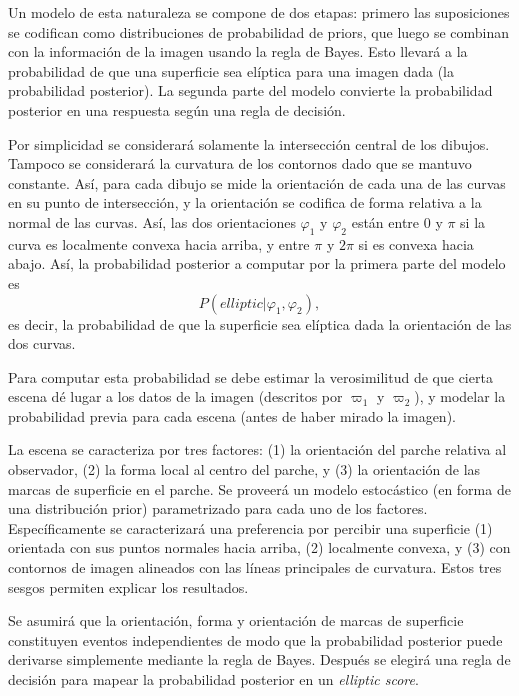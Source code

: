 \documentclass[a4paper,12pt]{article}
\begin{document}
Un modelo de esta naturaleza se compone de dos etapas: primero las suposiciones se codifican como distribuciones de probabilidad de priors, que luego se combinan con la información de la imagen usando la regla de Bayes. Esto llevará a la probabilidad de que una superficie sea elíptica para una imagen dada (la probabilidad posterior). La segunda parte del modelo convierte la probabilidad posterior en una respuesta según una regla de decisión.

Por simplicidad se considerará solamente la intersección central de los dibujos. Tampoco se considerará la curvatura de los contornos dado que se mantuvo constante. Así, para cada dibujo se mide la orientación de cada una de las curvas en su punto de intersección, y la orientación se codifica de forma relativa a la normal de las curvas. Así, las dos orientaciones $\varphi_{1}$ y $\varphi_{2}$ están entre 0 y $\pi$ si la curva es localmente convexa hacia arriba, y entre $\pi$ y $2\pi$ si es convexa hacia abajo. Así, la probabilidad posterior a computar por la primera parte del modelo es 
\begin{equation}
	P(elliptic | \varphi_{1}, \varphi_{2}),
\end{equation}
es decir, la probabilidad de que la superficie sea elíptica dada la orientación de las dos curvas.

Para computar esta probabilidad se debe estimar la verosimilitud de que cierta escena dé lugar a los datos de la imagen (descritos por $\varpi_{1}$ y $\varpi_{2}$), y modelar la probabilidad previa para cada escena (antes de haber mirado la imagen).

La escena se caracteriza por tres factores: (1) la orientación del parche relativa al observador, (2) la forma local al centro del parche, y (3) la orientación de las marcas de superficie en el parche. Se proveerá un modelo estocástico (en forma de una distribución prior) parametrizado para cada uno de los factores. Específicamente se caracterizará una preferencia por percibir una superficie (1) orientada con sus puntos normales hacia arriba, (2) localmente convexa, y (3) con contornos de imagen alineados con las líneas principales de curvatura. Estos tres sesgos permiten explicar los resultados.

Se asumirá que la orientación, forma y orientación de marcas de superficie constituyen eventos independientes de modo que la probabilidad posterior puede derivarse simplemente mediante la regla de Bayes. Después se elegirá una regla de decisión para mapear la probabilidad posterior en un {\itshape elliptic score}.
\end{document}
